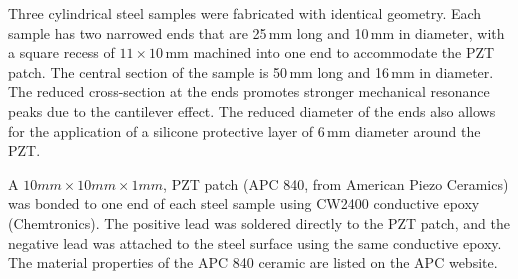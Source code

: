 \documentclass[journal,twoside,web]{ieeecolor}
\begin{document}
Three cylindrical steel samples were fabricated with identical geometry. Each sample has two narrowed ends that are 25\,mm long and 10\,mm in diameter, with a square recess of $11 \times 10$\,mm machined into one end to accommodate the PZT patch. The central section of the sample is 50\,mm long and 16\,mm in diameter. The reduced cross-section at the ends promotes stronger mechanical resonance peaks due to the cantilever effect. The reduced diameter of the ends also allows for the application of a silicone protective layer of 6\,mm diameter around the PZT.

A $10mm \times 10mm \times 1 mm$, PZT patch (APC 840, from American Piezo Ceramics) was bonded to one end of each steel sample using CW2400 conductive epoxy (Chemtronics)\cite{CW2400}. The positive lead was soldered directly to the PZT patch, and the negative lead was attached to the steel surface using the same conductive epoxy. The material properties of the APC 840 ceramic are listed on the APC website\cite{apc_piezo_properties}.
\end{document}
